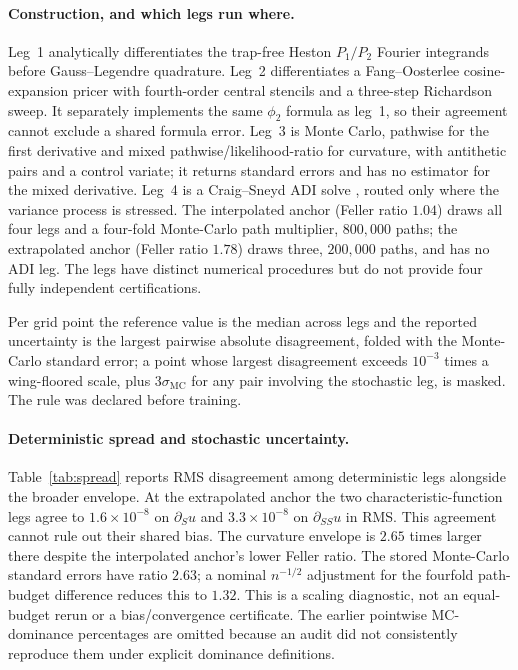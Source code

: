 \documentclass{article}
\begin{document}
\paragraph{Construction, and which legs run where.} Leg~1 analytically differentiates the
trap-free Heston $P_1/P_2$ Fourier integrands
\citep{heston1993closed,albrecher2007little} before Gauss--Legendre quadrature. Leg~2 differentiates a Fang--Oosterlee cosine-expansion
pricer \citep{fang2008novel} with fourth-order central stencils and a three-step
Richardson sweep. It separately implements the same $\phi_2$ formula as leg~1, so their agreement
cannot exclude a shared formula error. Leg~3 is
Monte Carlo, pathwise for the first derivative and mixed pathwise/likelihood-ratio
for curvature, with antithetic pairs and a control variate; it returns standard
errors and has no estimator for the mixed derivative. Leg~4 is a Craig--Sneyd ADI
solve \citep{craig1988alternating}, routed only where the variance process is
stressed. The interpolated anchor (Feller ratio $1.04$) draws all four legs and a
four-fold Monte-Carlo path multiplier, $800{,}000$ paths; the extrapolated anchor
(Feller ratio $1.78$) draws three, $200{,}000$ paths, and has no ADI leg. The legs have distinct numerical procedures but do not provide four fully
independent certifications.

Per grid point the reference value is the median across legs and the reported
uncertainty is the largest pairwise absolute disagreement, folded with the
Monte-Carlo standard error; a point whose largest disagreement exceeds
$10^{-3}$ times a wing-floored scale, plus $3\sigma_{\mathrm{MC}}$ for any pair
involving the stochastic leg, is masked. The rule was declared before training.

\paragraph{Deterministic spread and stochastic uncertainty.}
Table~\ref{tab:spread} reports RMS disagreement among deterministic legs alongside
the broader envelope. At the extrapolated anchor the two characteristic-function
legs agree to $1.6\times10^{-8}$ on $\partial_Su$ and $3.3\times10^{-8}$ on
$\partial_{SS}u$ in RMS. This agreement cannot rule out their shared bias.
The curvature envelope is $2.65$ times larger there despite the interpolated
anchor's lower Feller ratio. The stored Monte-Carlo standard errors have ratio
$2.63$; a nominal $n^{-1/2}$ adjustment for the fourfold path-budget difference
reduces this to $1.32$. This is a scaling diagnostic, not an equal-budget rerun or
a bias/convergence certificate. The earlier pointwise MC-dominance percentages
are omitted because an audit did not consistently reproduce them under explicit
dominance definitions.
\end{document}
